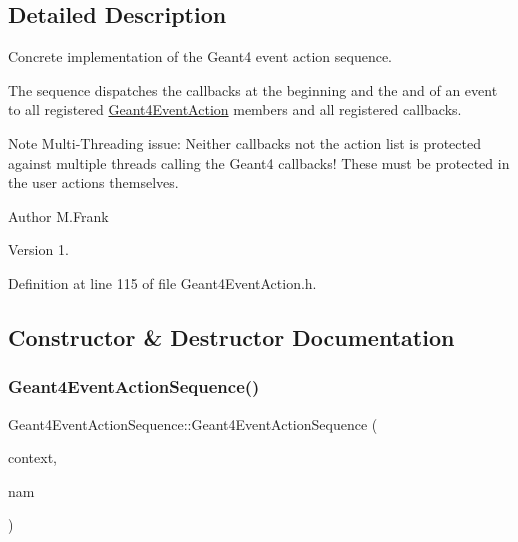 \subsection{Detailed Description}
Concrete implementation of the Geant4 event action sequence. 

The sequence dispatches the callbacks at the beginning and the and of an event to all registered \hyperlink{class_d_d4hep_1_1_simulation_1_1_geant4_event_action}{Geant4\+Event\+Action} members and all registered callbacks.

Note Multi-\/\+Threading issue\+: Neither callbacks not the action list is protected against multiple threads calling the Geant4 callbacks! These must be protected in the user actions themselves.

\begin{DoxyAuthor}{Author}
M.\+Frank 
\end{DoxyAuthor}
\begin{DoxyVersion}{Version}
1. 
\end{DoxyVersion}


Definition at line 115 of file Geant4\+Event\+Action.\+h.



\subsection{Constructor \& Destructor Documentation}
\hypertarget{class_d_d4hep_1_1_simulation_1_1_geant4_event_action_sequence_aae9103fd1f5de6027adf6f9d652423f9}{}\label{class_d_d4hep_1_1_simulation_1_1_geant4_event_action_sequence_aae9103fd1f5de6027adf6f9d652423f9} 
\subsubsection{\texorpdfstring{Geant4\+Event\+Action\+Sequence()}{Geant4EventActionSequence()}}
{\footnotesize\ttfamily Geant4\+Event\+Action\+Sequence\+::\+Geant4\+Event\+Action\+Sequence (\begin{DoxyParamCaption}\item[{\hyperlink{class_d_d4hep_1_1_simulation_1_1_geant4_context}{Geant4\+Context} $\ast$}]{context,  }\item[{const std\+::string \&}]{nam }\end{DoxyParamCaption})}



